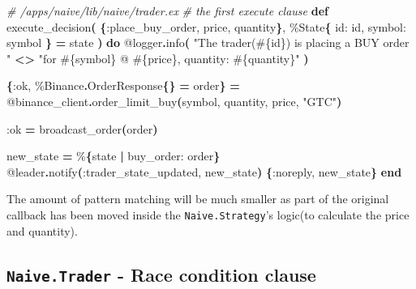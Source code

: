 \documentclass[
  oneside]{book}
\newenvironment{Shaded}{\begin{snugshade}}{\end{snugshade}}
\newcommand{\CommentTok}[1]{\textcolor[rgb]{0.56,0.35,0.01}{\textit{#1}}}
\newcommand{\ConstantTok}[1]{\textcolor[rgb]{0.56,0.35,0.01}{#1}}
\newcommand{\FunctionTok}[1]{\textcolor[rgb]{0.13,0.29,0.53}{\textbf{#1}}}
\newcommand{\KeywordTok}[1]{\textcolor[rgb]{0.13,0.29,0.53}{\textbf{#1}}}
\newcommand{\NormalTok}[1]{#1}
\newcommand{\OperatorTok}[1]{\textcolor[rgb]{0.81,0.36,0.00}{\textbf{#1}}}
\newcommand{\OtherTok}[1]{\textcolor[rgb]{0.56,0.35,0.01}{#1}}
\newcommand{\StringTok}[1]{\textcolor[rgb]{0.31,0.60,0.02}{#1}}
\newcommand{\VariableTok}[1]{\textcolor[rgb]{0.00,0.00,0.00}{#1}}
\begin{document}
\begin{Shaded}
\begin{Highlighting}[]
\CommentTok{\# /apps/naive/lib/naive/trader.ex}
\CommentTok{\# the first execute clause}
  \KeywordTok{def}\NormalTok{ execute\_decision}\FunctionTok{(}
         \FunctionTok{\{}\VariableTok{:place\_buy\_order}\NormalTok{, price, quantity}\FunctionTok{\}}\NormalTok{,}
\NormalTok{         \%}\ConstantTok{State}\FunctionTok{\{}
           \VariableTok{id:}\NormalTok{ id,}
           \VariableTok{symbol:}\NormalTok{ symbol}
         \FunctionTok{\}} \OperatorTok{=}\NormalTok{ state}
       \FunctionTok{)} \KeywordTok{do}
    \OtherTok{@logger}\OperatorTok{.}\NormalTok{info}\FunctionTok{(}
      \StringTok{"The trader(}\OtherTok{\#\{}\NormalTok{id}\OtherTok{\}}\StringTok{) is placing a BUY order "} \OperatorTok{\textless{}\textgreater{}}
        \StringTok{"for }\OtherTok{\#\{}\NormalTok{symbol}\OtherTok{\}}\StringTok{ @ }\OtherTok{\#\{}\NormalTok{price}\OtherTok{\}}\StringTok{, quantity: }\OtherTok{\#\{}\NormalTok{quantity}\OtherTok{\}}\StringTok{"}
    \FunctionTok{)}

    \FunctionTok{\{}\VariableTok{:ok}\NormalTok{, \%}\ConstantTok{Binance}\OperatorTok{.}\ConstantTok{OrderResponse}\FunctionTok{\{\}} \OperatorTok{=}\NormalTok{ order}\FunctionTok{\}} \OperatorTok{=}
      \OtherTok{@binance\_client}\OperatorTok{.}\NormalTok{order\_limit\_buy}\FunctionTok{(}\NormalTok{symbol, quantity, price, }\StringTok{"GTC"}\FunctionTok{)}

    \VariableTok{:ok} \OperatorTok{=}\NormalTok{ broadcast\_order}\FunctionTok{(}\NormalTok{order}\FunctionTok{)}

\NormalTok{    new\_state }\OperatorTok{=}\NormalTok{ \%}\FunctionTok{\{}\NormalTok{state }\OperatorTok{|} \VariableTok{buy\_order:}\NormalTok{ order}\FunctionTok{\}}
    \OtherTok{@leader}\OperatorTok{.}\NormalTok{notify}\FunctionTok{(}\VariableTok{:trader\_state\_updated}\NormalTok{, new\_state}\FunctionTok{)}
    \FunctionTok{\{}\VariableTok{:noreply}\NormalTok{, new\_state}\FunctionTok{\}}
  \KeywordTok{end}
\end{Highlighting}
\end{Shaded}

The amount of pattern matching will be much smaller as part of the original callback has been moved inside the \texttt{Naive.Strategy}'s logic(to calculate the price and quantity).

\subsection{\texorpdfstring{\texttt{Naive.Trader} - Race condition clause}{Naive.Trader - Race condition clause}}\label{naive.trader---race-condition-clause}
\end{document}

